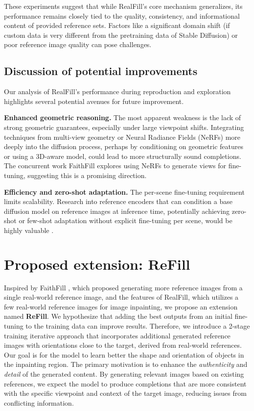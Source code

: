 \documentclass{article}
\begin{document}
These experiments suggest that while RealFill's core mechanism generalizes, its performance remains closely tied to the quality, consistency, and informational content of provided reference sets. Factors like a significant domain shift (if custom data is very different from the pretraining data of Stable Diffusion) or poor reference image quality can pose challenges.

\subsection{Discussion of potential improvements}
\label{subsec:potential_improvements}
Our analysis of RealFill's performance during reproduction and exploration highlights several potential avenues for future improvement.

\textbf{Enhanced geometric reasoning.} The most apparent weakness is the lack of strong geometric guarantees, especially under large viewpoint shifts. Integrating techniques from multi-view geometry or Neural Radiance Fields (NeRFs) \cite{mildenhall2020nerf} more deeply into the diffusion process, perhaps by conditioning on geometric features or using a 3D-aware model, could lead to more structurally sound completions. The concurrent work FaithFill \cite{mallick2024faithfill} explores using NeRFs to generate views for fine-tuning, suggesting this is a promising direction.

\textbf{Efficiency and zero-shot adaptation.} The per-scene fine-tuning requirement limits scalability. Research into reference encoders that can condition a base diffusion model on reference images at inference time, potentially achieving zero-shot or few-shot adaptation without explicit fine-tuning per scene, would be highly valuable \cite{yang2023paint}.

\section{Proposed extension: ReFill}
\label{sec:extension}
Inspired by FaithFill \cite{mallick2024faithfill}, which proposed generating more reference images from a single real-world reference image, and the features of RealFill, which utilizes a few real-world reference images for image inpainting, we propose an extension named \textbf{ReFill}. We hypothesize that adding the best outputs from an initial fine-tuning to the training data can improve results. Therefore, we introduce a 2-stage training iterative approach that incorporates additional generated reference images with orientations close to the target, derived from real-world references. Our goal is for the model to learn better the shape and orientation of objects in the inpainting region. The primary motivation is to enhance the \emph{authenticity} and \emph{detail} of the generated content. By generating relevant images based on existing references, we expect the model to produce completions that are more consistent with the specific viewpoint and context of the target image, reducing issues from conflicting information.
\end{document}
